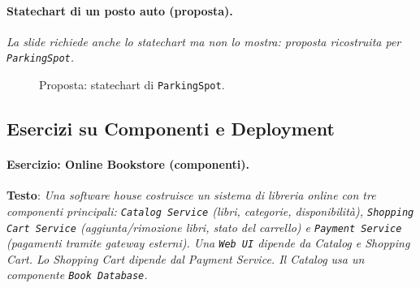 \documentclass[12pt]{extarticle}
\begin{document}
\paragraph{Statechart di un posto auto (proposta).}
\textit{La slide richiede anche lo statechart ma non lo mostra: proposta ricostruita per \texttt{ParkingSpot}.}

\begin{figure}[H]
    \centering
{}
    \caption{Proposta: statechart di \texttt{ParkingSpot}.}
\end{figure}

\subsection{Esercizi su Componenti e Deployment}

\paragraph{Esercizio: Online Bookstore (componenti).}
\textbf{Testo}: \textit{Una software house costruisce un sistema di libreria online con tre componenti principali: \texttt{Catalog Service} (libri, categorie, disponibilità), \texttt{Shopping Cart Service} (aggiunta/rimozione libri, stato del carrello) e \texttt{Payment Service} (pagamenti tramite gateway esterni). Una \texttt{Web UI} dipende da Catalog e Shopping Cart. Lo Shopping Cart dipende dal Payment Service. Il Catalog usa un componente \texttt{Book Database}.}
\end{document}
